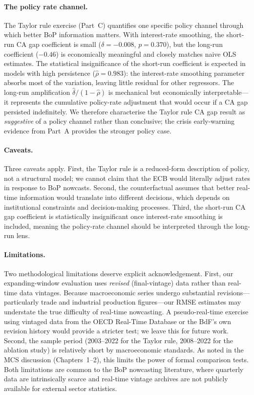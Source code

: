 \paragraph{The policy rate channel.}
The Taylor rule exercise (Part~C) quantifies one specific policy channel through which better BoP information matters.  With interest-rate smoothing, the short-run CA gap coefficient is small ($\hat{\delta} = -0.008$, $p = 0.370$), but the long-run coefficient ($-0.46$) is economically meaningful and closely matches naive OLS estimates.  The statistical insignificance of the short-run coefficient is expected in models with high persistence ($\hat{\rho} = 0.983$): the interest-rate smoothing parameter absorbs most of the variation, leaving little residual for other regressors.  The long-run amplification $\hat{\delta}/(1-\hat{\rho})$ is mechanical but economically interpretable---it represents the cumulative policy-rate adjustment that would occur if a CA gap persisted indefinitely.  We therefore characterise the Taylor rule CA gap result as \emph{suggestive} of a policy channel rather than conclusive; the crisis early-warning evidence from Part~A provides the stronger policy case.

\paragraph{Caveats.}
Three caveats apply.  First, the Taylor rule is a reduced-form description of policy, not a structural model; we cannot claim that the ECB would literally adjust rates in response to BoP nowcasts.  Second, the counterfactual assumes that better real-time information would translate into different decisions, which depends on institutional constraints and decision-making processes.  Third, the short-run CA gap coefficient is statistically insignificant once interest-rate smoothing is included, meaning the policy-rate channel should be interpreted through the long-run lens.

\paragraph{Limitations.}
Two methodological limitations deserve explicit acknowledgement.  First, our expanding-window evaluation uses \emph{revised} (final-vintage) data rather than real-time data vintages.  Because macroeconomic series undergo substantial revisions---particularly trade and industrial production figures---our RMSE estimates may understate the true difficulty of real-time nowcasting.  A pseudo-real-time exercise using vintaged data from the OECD Real-Time Database or the BdF's own revision history would provide a stricter test; we leave this for future work.  Second, the sample period (2003--2022 for the Taylor rule, 2008--2022 for the ablation study) is relatively short by macroeconomic standards.  As noted in the MCS discussion (Chapters~1--2), this limits the power of formal comparison tests.  Both limitations are common to the BoP nowcasting literature, where quarterly data are intrinsically scarce and real-time vintage archives are not publicly available for external sector statistics.

